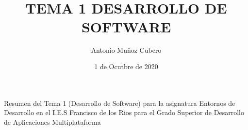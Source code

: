 \documentclass{article}
\title{TEMA 1 DESARROLLO DE SOFTWARE}
\author{Antonio Muñoz Cubero}
\date{1 de Ocutbre de 2020}
\begin{document}
\maketitle
Resumen del Tema 1 (Desarrollo de Software) para la asignatura Entornos de Desarrollo en el 
I.E.S Francisco de los Rios para el Grado Superior de Desarrollo de Aplicaciones Multiplataforma
\end{document}
